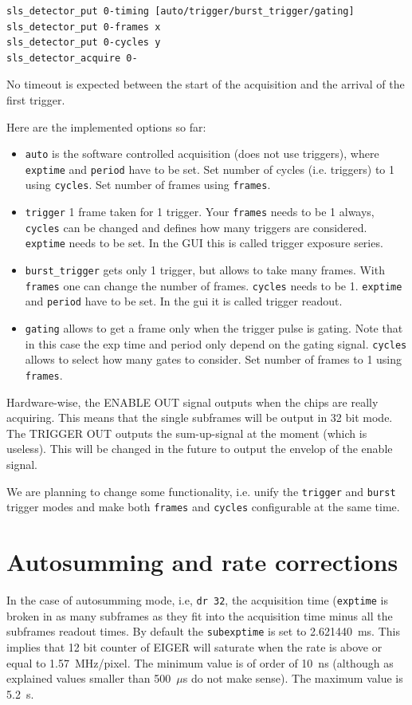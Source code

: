 \documentclass{article}
\newcommand{\E}{EIGER\xspace}
\begin{document}
\begin{verbatim}
sls_detector_put 0-timing [auto/trigger/burst_trigger/gating]
sls_detector_put 0-frames x
sls_detector_put 0-cycles y
sls_detector_acquire 0-
\end{verbatim}
No timeout is expected between the start of the acquisition and the arrival of the first trigger. 

Here are the implemented options so far:
\begin{itemize}
\item {\tt{auto}} is the software controlled acquisition (does not use triggers), where {\tt{exptime}} and {\tt{period}} have to be set. Set number of cycles (i.e. triggers) to 1 using {\tt{cycles}}. Set number of frames using {\tt{frames}}.
\item {\tt{trigger}} 1 frame taken for 1 trigger. Your {\tt{frames}} needs to be  1 always, {\tt{cycles}} can be changed and defines how many triggers are considered.  {\tt{exptime}} needs to be set. In the GUI this is called trigger exposure series.  
\item {\tt{burst\_trigger}} gets only 1 trigger, but allows to take many frames. With {\tt{frames}} one can change the number of frames. {\tt{cycles}} needs to be 1.  {\tt{exptime}} and {\tt{period}} have to be set. In the gui it is called trigger readout.
\item{\tt{gating}} allows to get a frame only when the trigger pulse is gating. Note that in this case the exp time and period only depend on the gating signal. {\tt{cycles}} allows to select how many gates to consider.  Set number of frames to 1 using {\tt{frames}}.
\end{itemize}

Hardware-wise, the ENABLE OUT signal outputs when the chips are really acquiring. This means that the single subframes will be output in 32 bit mode. The TRIGGER OUT outputs the sum-up-signal at the moment (which is useless). This will be changed in the future to output the envelop of the enable signal. 

We are planning to change some functionality, i.e. unify the {\tt{trigger}} and {\tt{burst}} trigger modes and make both {\tt{frames}} and {\tt{cycles}} configurable at the same time.

\section{Autosumming and rate corrections} \label{advanced}

In the case of autosumming mode, i.e, {\tt{dr 32}}, the acquisition time ({\tt{exptime}} is broken in as many subframes as they fit into the acquisition time minus all the subframes readout times. By default the {\tt{subexptime}} is set to 2.621440~ms. This implies that 12 bit counter of \E will saturate when the rate is above or equal to 1.57~MHz/pixel. The minimum value is of order of 10~ns (although as explained values smaller than 500~$\mu$s do not make sense). The maximum value is 5.2~s.
\end{document}
